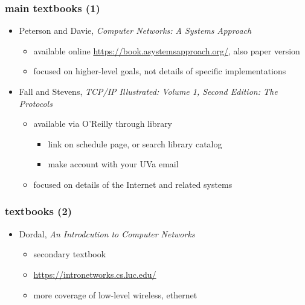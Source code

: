 
\begin{frame}\frametitle{main textbooks (1)}
    \begin{itemize}
    \item Peterson and Davie, \textit{Computer Networks:  A Systems Approach}
        \begin{itemize}
        \item available online \url{https://book.asystemsapproach.org/}, also paper version
        \item focused on higher-level goals, not details of specific implementations
        \end{itemize}
    \item Fall and Stevens, \textit{TCP/IP Illustrated: Volume 1, Second Edition: The Protocols}
        \begin{itemize}
        \item available via O'Reilly through library
            \begin{itemize}
            \item link on schedule page, or search library catalog
            \item make account with your UVa email
            \end{itemize}
        \item focused on details of the Internet and related systems
        \end{itemize}
    \end{itemize}
\end{frame}

\begin{frame}\frametitle{textbooks (2)}
    \begin{itemize}
    \item Dordal, \textit{An Introdcution to Computer Networks}
        \begin{itemize}
        \item secondary textbook
        \item \url{https://intronetworks.cs.luc.edu/}
        \item more coverage of low-level wireless, ethernet
        \end{itemize}
    \end{itemize}
\end{frame}

